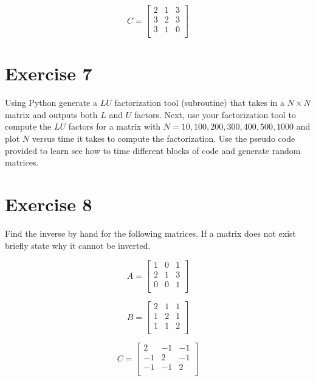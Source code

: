 \documentclass[12pt]{article}
\begin{document}
\begin{equation}
    C = 
    \begin{bmatrix}
        2       &       1       &   3   \\
        3       &       2       &   3   \\
        3       &       1       &   0   \\
    \end{bmatrix}
\end{equation}

\section{Exercise 7}
Using Python generate a $LU$ factorization tool (subroutine) that takes
in a $N \times N$ matrix and outputs both $L$ and $U$ factors. Next, use
your factorization tool to compute the $LU$ factors for a matrix with 
$N=10, 100, 200, 300, 400, 500, 1000$ and plot $N$ versus time it takes to
compute the factorization. Use the pseudo code provided to learn see how to
time different blocks of code and generate random matrices. 

\section{Exercise 8}
Find the inverse by hand for the following matrices. If a matrix does not
exist briefly state why it cannot be inverted.

\begin{equation}
    A = 
    \begin{bmatrix}
        1       &       0       &   1   \\
        2       &       1       &   3   \\
        0       &       0       &   1   \\
    \end{bmatrix}
\end{equation}

\begin{equation}
    B = 
    \begin{bmatrix}
        2       &       1       &   1   \\
        1       &       2       &   1   \\
        1       &       1       &   2   \\
    \end{bmatrix}
\end{equation}

\begin{equation}
    C = 
    \begin{bmatrix}
        2       &       -1      &   -1  \\
        -1      &       2       &   -1  \\
        -1      &       -1      &   2   \\
    \end{bmatrix}
\end{equation}
\end{document}
